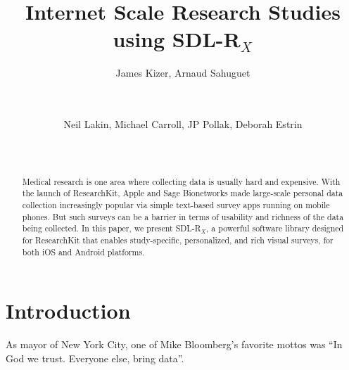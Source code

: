 \documentclass{acm_proc_article-sp}
\newcommand{\sdlrx}{SDL-R$_X$}
\begin{document}

\title{Internet Scale Research Studies using \sdlrx{}}


\author{
\alignauthor
James Kizer, Arnaud Sahuguet\\
       \\
       \\
\and
Neil Lakin, Michael Carroll, JP Pollak, Deborah Estrin
\\
       \\
       \\
}

\maketitle \begin{abstract} Medical research is one area where collecting data
is usually hard and expensive. With the launch of ResearchKit, Apple and Sage
Bionetworks made large-scale personal data collection increasingly popular via
simple text-based survey apps running on mobile phones. But such surveys can
be a barrier in terms of usability and richness of the data being collected.
In this paper, we present \sdlrx, a powerful software library designed for
ResearchKit that enables study-specific, personalized, and rich visual
surveys, for both iOS and Android platforms.

\end{abstract}





\section{Introduction}
As mayor of New York City, one of Mike Bloomberg's favorite mottos was ``In God we trust. Everyone else, bring data''.
\end{document}
